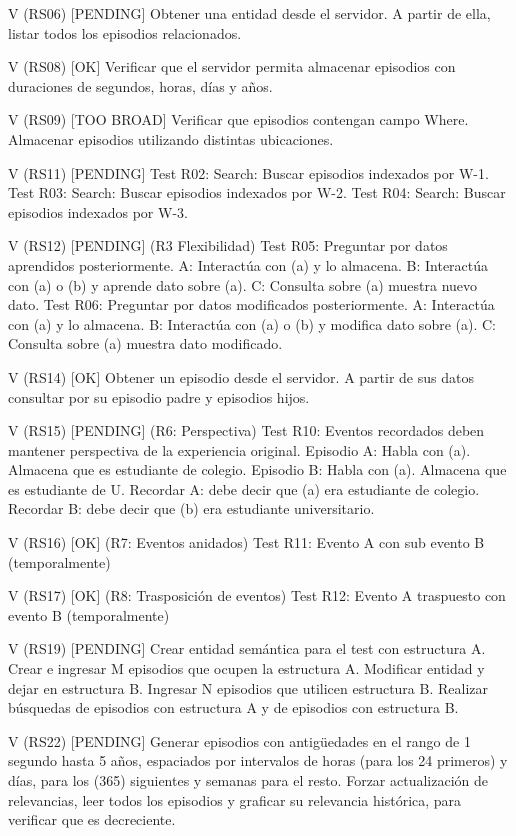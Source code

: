 V (RS06) [PENDING]
Obtener una entidad desde el servidor. A partir de ella, listar todos los episodios relacionados.

V (RS08) [OK]
Verificar que el servidor permita almacenar episodios con duraciones de segundos, horas, días y años.

V (RS09) [TOO BROAD]
Verificar que episodios contengan campo Where. Almacenar episodios utilizando distintas ubicaciones.

V (RS11) [PENDING]
Test R02: Search: Buscar episodios indexados por W-1.
Test R03: Search: Buscar episodios indexados por W-2.
Test R04: Search: Buscar episodios indexados por W-3.


V (RS12) [PENDING]
(R3 Flexibilidad)
Test R05: Preguntar por datos aprendidos posteriormente.
A: Interactúa con (a) y lo almacena.
B: Interactúa con (a) o (b) y aprende dato sobre (a).
C: Consulta sobre (a) muestra nuevo dato.
Test R06: Preguntar por datos modificados posteriormente.
A: Interactúa con (a) y lo almacena.
B: Interactúa con (a) o (b) y modifica dato sobre (a).
C: Consulta sobre (a) muestra dato modificado.


V (RS14) [OK]
Obtener un episodio desde el servidor. A partir de sus datos consultar por su episodio padre y episodios hijos.

V (RS15) [PENDING]
(R6: Perspectiva)
Test R10: Eventos recordados deben mantener perspectiva de la experiencia original.
Episodio A: Habla con (a). Almacena que es estudiante de colegio.
Episodio B: Habla con (a). Almacena que es estudiante de U.
Recordar A: debe decir que (a) era estudiante de colegio.
Recordar B: debe decir que (b) era estudiante universitario. 

V (RS16) [OK]
(R7: Eventos anidados)
Test R11: Evento A con sub evento B (temporalmente)

V (RS17) [OK]
(R8: Trasposición de eventos)
Test R12: Evento A traspuesto con evento B (temporalmente)


V (RS19) [PENDING]
Crear entidad semántica para el test con estructura A. Crear e ingresar M episodios que ocupen la estructura A. Modificar entidad y dejar en estructura B. Ingresar N episodios que utilicen estructura B. Realizar búsquedas de episodios con estructura A y de episodios con estructura B.


V (RS22) [PENDING]
Generar episodios con antigüedades en el rango de 1 segundo hasta 5 años, espaciados por intervalos de horas (para los 24 primeros) y días, para los (365) siguientes y semanas para el resto. Forzar actualización de relevancias, leer todos los episodios y graficar su relevancia histórica, para verificar que es decreciente.

